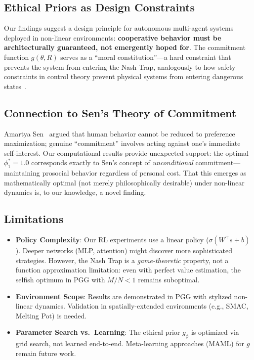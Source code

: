 \documentclass{article}
\begin{document}
\subsection{Ethical Priors as Design Constraints}

Our findings suggest a design principle for autonomous multi-agent systems deployed in non-linear environments: \textbf{cooperative behavior must be architecturally guaranteed, not emergently hoped for}.
The commitment function $g(\theta, R)$ serves as a ``moral constitution''---a hard constraint that prevents the system from entering the Nash Trap, analogously to how safety constraints in control theory prevent physical systems from entering dangerous states~\cite{amodei2016concrete}.

\subsection{Connection to Sen's Theory of Commitment}

Amartya Sen~\cite{sen1977rational} argued that human behavior cannot be reduced to preference maximization; genuine ``commitment'' involves acting against one's immediate self-interest.
Our computational results provide unexpected support: the optimal $\phi_1^* = 1.0$ corresponds exactly to Sen's concept of \emph{unconditional} commitment---maintaining prosocial behavior regardless of personal cost.
That this emerges as mathematically optimal (not merely philosophically desirable) under non-linear dynamics is, to our knowledge, a novel finding.

\subsection{Limitations}

\begin{itemize}
    \item \textbf{Policy Complexity}: Our RL experiments use a linear policy ($\sigma(W^\top s + b)$).
    Deeper networks (MLP, attention) might discover more sophisticated strategies.
    However, the Nash Trap is a \emph{game-theoretic} property, not a function approximation limitation: even with perfect value estimation, the selfish optimum in PGG with $M/N < 1$ remains suboptimal.
    \item \textbf{Environment Scope}: Results are demonstrated in PGG with stylized non-linear dynamics.
    Validation in spatially-extended environments (e.g., SMAC, Melting Pot) is needed.
    \item \textbf{Parameter Search vs.\ Learning}: The ethical prior $g_\phi$ is optimized via grid search, not learned end-to-end.
    Meta-learning approaches (MAML) for $g$ remain future work.
\end{itemize}
\end{document}
